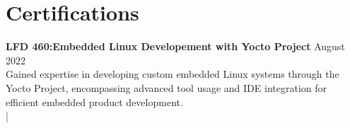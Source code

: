 \documentclass[letter,12pt]{article}
\begin{document}
\section*{Certifications}
\vspace{-.25cm}
\textbf{LFD 460:Embedded Linux Developement with Yocto
Project} \hfill August 2022\\ 
Gained expertise in developing custom embedded Linux systems through the Yocto Project, encompassing advanced tool usage and IDE integration for efficient embedded product development.\\
\href{https://www.credly.com/badges/2a1ad89a-9c46-4145-a715-128f7a8fd1db/public_url}
{} |
\href{https://ti-user-certificates.s3.amazonaws.com/e0df7fbf-a057-42af-8a1f-590912be5460/fcc7abec-e782-4b52-a893-697157cb2e3b-dylan-garza-9cd517ca-cff3-4ee2-898e-4173cb45d893-certificate.pdf}
{}

\vspace{-.5cm}

\end{document}
